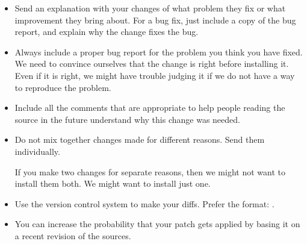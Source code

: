 \begin{itemize}
\item
  Send an explanation with your changes of what problem they fix or what improvement they bring
  about.  For a bug fix, just include a copy of the bug report, and explain why the change fixes
  the bug.

\item
  Always include a proper bug report for the problem you think you have fixed.  We need to
  convince ourselves that the change is right before installing it.  Even if it is right, we
  might have trouble judging it if we do not have a way to reproduce the problem.

\item
  Include all the comments that are appropriate to help people reading the source in the future
  understand why this change was needed.

\item
  Do not mix together changes made for different reasons.  Send them individually.

  If you make two changes for separate reasons, then we might not want to install them both.  We
  might want to install just one.

\item
  Use the version control system to make your diffs.  Prefer the
   format: .

\item
  You can increase the probability that your patch gets applied by basing it on a recent
  revision of the sources.
\end{itemize}



